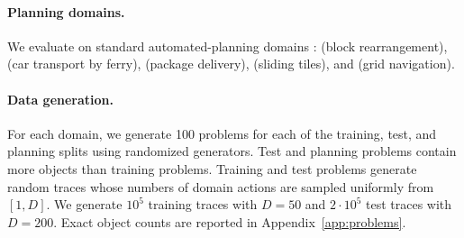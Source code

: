 \paragraph{Planning domains.}
We evaluate on standard automated-planning domains
\citep{long20033rd,fern2011first,taitler20242023}:
\textbf{\bw} (block rearrangement),
\textbf{\fr} (car transport by ferry),
\textbf{\lgt} (package delivery),
\textbf{\np} (sliding tiles), and
\textbf{\mz} (grid navigation).

\paragraph{Data generation.}
For each domain, we generate 100 problems for each of the training, test, and planning splits using randomized generators.
Test and planning problems contain more objects than training problems. Training and test problems generate random traces whose numbers of domain actions are sampled uniformly from $[1,D]$. We generate $10^5$ training traces with $D=50$ and
$2\cdot10^5$ test traces with $D=200$. Exact object counts are reported in Appendix~\ref{app:problems}.

